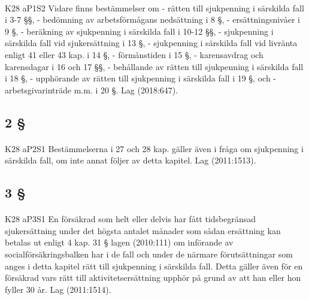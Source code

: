 \documentclass[a4paper,notitlepage,openany,10pt]{book}
\begin{document}
\paragraph*{}
{\tiny K28 aP1S2}
Vidare finns bestämmelser om
\newline - rätten till sjukpenning i särskilda fall i 3-7 §§,
\newline - bedömning av arbetsförmågans nedsättning i 8 §,
\newline - ersättningsnivåer i 9 §,
\newline - beräkning av sjukpenning i särskilda fall i 10-12 §§,
\newline - sjukpenning i särskilda fall vid sjukersättning i 13 §,
\newline - sjukpenning i särskilda fall vid livränta enligt 41 eller 43 kap. i 14 §,
\newline - förmånstiden i 15 §,
\newline - karensavdrag och karensdagar i 16 och 17 §§,
\newline - behållande av rätten till sjukpenning i särskilda fall i 18 §,
\newline - upphörande av rätten till sjukpenning i särskilda fall i 19 §, och
\newline - arbetsgivarinträde m.m. i 20 §.
Lag (2018:647).
\subsection*{2 §}
\paragraph*{}
{\tiny K28 aP2S1}
Bestämmelserna i 27 och 28 kap. gäller även i fråga om sjukpenning i särskilda fall, om inte annat följer av detta kapitel.
Lag (2011:1513).
\subsection*{3 §}
\paragraph*{}
{\tiny K28 aP3S1}
En försäkrad som helt eller delvis har fått tidsbegränsad sjukersättning under det högsta antalet månader som sådan ersättning kan betalas ut enligt 4 kap. 31 § lagen (2010:111) om införande av socialförsäkringsbalken har i de fall och under de närmare förutsättningar som anges i detta kapitel rätt till sjukpenning i särskilda fall. Detta gäller även för en försäkrad vars rätt till aktivitetsersättning upphör på grund av att han eller hon fyller 30 år.
Lag (2011:1514).
\end{document}
